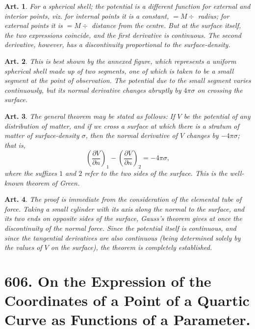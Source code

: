 \documentclass[12pt,a4paper]{article}
\theoremstyle{cayley}
\newtheorem{art}{Art.}[section]
\begin{document}
\begin{art}
For a spherical shell; the potential is a different function for external and interior points, viz. for internal points it is a constant, $= M \div$ radius; for external points it is $= M \div$ distance from the centre. But at the surface itself, the two expressions coincide, and the first derivative is continuous. The second derivative, however, has a discontinuity proportional to the surface-density.
\end{art}

\begin{art}
This is best shown by the annexed figure, which represents a uniform spherical shell made up of two segments, one of which is taken to be a small segment at the point of observation. The potential due to the small segment varies continuously, but its normal derivative changes abruptly by $4\pi\sigma$ on crossing the surface.
\end{art}

\begin{art}
The general theorem may be stated as follows: If $V$ be the potential of any distribution of matter, and if we cross a surface at which there is a stratum of matter of surface-density $\sigma$, then the normal derivative of $V$ changes by $-4\pi\sigma$; that is,
\[
\left(\frac{\partial V}{\partial n}\right)_1 - \left(\frac{\partial V}{\partial n}\right)_2 = -4\pi\sigma,
\]
where the suffixes $1$ and $2$ refer to the two sides of the surface. This is the well-known theorem of Green.
\end{art}

\begin{art}
The proof is immediate from the consideration of the elemental tube of force. Taking a small cylinder with its axis along the normal to the surface, and its two ends on opposite sides of the surface, Gauss's theorem gives at once the discontinuity of the normal force. Since the potential itself is continuous, and since the tangential derivatives are also continuous (being determined solely by the values of $V$ on the surface), the theorem is completely established.
\end{art}


\newpage
\section[On the Expression of the Coordinates of a Point of a Quartic Curve as Functions of a Parameter]%
{606. On the Expression of the Coordinates of a Point of a Quartic Curve as Functions of a Parameter.}
\end{document}
